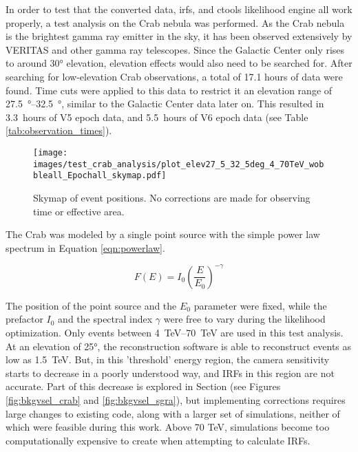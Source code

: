   In order to test that the converted data, irfs, and ctools likelihood engine all work properly, a test analysis on the Crab nebula was performed.
  As the Crab nebula is the brightest gamma ray emitter in the sky, it has been observed extensively by VERITAS and other gamma ray telescopes.
  Since the Galactic Center only rises to around \ang{30} elevation, elevation effects would also need to be searched for.
  After searching for low-elevation Crab observations, a total of 17.1 hours of data were found.
  Time cuts were applied to this data to restrict it an elevation range of \SIrange{27.5}{32.5}{\degree}, similar to the Galactic Center data later on.
  This resulted in \SI{3.3}{hours} of V5 epoch data, and \SI{5.5}{hours} of V6 epoch data (see Table \ref{tab:observation_times}).
    
  \begin{figure}[h]
    \centering
    \texttt{[image: images/test\_crab\_analysis/plot\_elev27\_5\_32\_5deg\_4\_70TeV\_wobbleall\_Epochall\_skymap.pdf]}
    \caption[Crab Counts Skymap]
    {
      Skymap of event positions.
      No corrections are made for observing time or effective area.
    }
    \label{fig:crab_skymap}
  \end{figure}
  
  The Crab was modeled by a single point source with the simple power law spectrum in Equation \ref{eqn:powerlaw}.

  \begin{equation} \label{eqn:powerlaw}
  F\left( E \right) = I_{0} \left( \frac{E}{E_{0}} \right)^{-\gamma}
  \end{equation}

  The position of the point source and the $E_{0}$ parameter were fixed, while the prefactor $I_{0}$ and the spectral index $\gamma$ were free to vary during the likelihood optimization.
  Only events between \SIrange{4}{70}{TeV} are used in this test analysis.
  At an elevation of \ang{25}, the reconstruction software is able to reconstruct events as low as \SI{1.5}{TeV}.
  But, in this 'threshold' energy region, the camera sensitivity starts to decrease in a poorly understood way, and IRFs in this region are not accurate.
  Part of this decrease is explored in Section (see Figures \ref{fig:bkgvsel_crab} and \ref{fig:bkgvsel_sgra}), but implementing corrections requires large changes to existing code, along with a larger set of simulations, neither of which were feasible during this work.
  Above 70 TeV, simulations become too computationally expensive to create when attempting to calculate IRFs.
    
